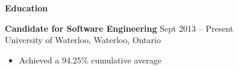 \documentclass{letter}
\begin{document}
{\bfseries \Large Education}

\vspace{-1.5mm}
{\bfseries Candidate for Software Engineering} \hfill Sept 2013 -- Present \\
University of Waterloo, Waterloo, Ontario
\vspace{-3mm}
\begin{itemize}
    \item Achieved a 94.25\% cumulative average
\end{itemize}
\end{document}
